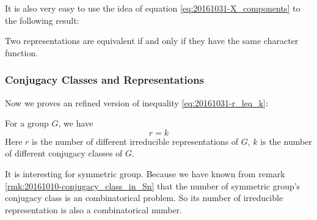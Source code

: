     It is also very easy to use the idea of equation
    \ref{eq:20161031-X_components} to the following result:
    \begin{thm}
        \label{thm:20161031-character-determine-rep}
        Two representations are equivalent if and only if they have
        the same character function.
    \end{thm}
    \subsubsection{Conjugacy Classes and Representations}
    \label{sec:Conjugacy-Classes-and-Representations}
    
    Now we proves an refined version of inequality
    \ref{eq:20161031-r_leq_k}:
    \begin{thm}
        For a group $G$, we have
        \begin{equation}
            r=k
        \end{equation}
        Here $r$ is the number of different irreducible
        representations of $G$, $k$ is the number of different conjugacy
        classes of $G$.
    \end{thm}
    \begin{ex}
        It is interesting for symmetric group. Because we have known
        from remark \ref{rmk:20161010-conjugacy_class_in_Sn} that the
        number of symmetric group's conjugacy class is an
        combinatorical problem. So its number of irreducible
        representation is also a combinatorical number.
    \end{ex}
